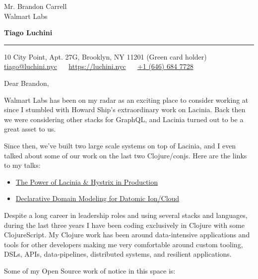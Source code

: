 \documentclass{letter} %
\begin{document}
\signature{Tiago Luchini}                  %
\longindentation=0pt                       %
\let\raggedleft\raggedright                %
 
 
\begin{letter}{Mr. Brandon Carrell \\
Walmart Labs}


\begin{flushleft}
{\large\bf Tiago Luchini}
\end{flushleft}
\medskip\hrule
\begin{flushright}
\hfill 10 City Point, Apt. 27G, Brooklyn, NY 11201 (Green card holder)\\ \hfill
\href{mailto:tiago@luchini.nyc}{tiago@luchini.nyc} ~~
\href{https://luchini.nyc}{https://luchini.nyc} ~~ \href{tel:+16466847728}{+1
  (646) 684 7728}
\end{flushright}
\vfill %
 
\opening{Dear Brandon,}


\noindent Walmart Labs has been on my radar as an exciting place to
consider working at since I stumbled with Howard Ship’s extraordinary
work on Lacinia. Back then we were considering other stacks for
GraphQL, and Lacinia turned out to be a great asset to us.

\noindent Since then, we’ve built two large scale systems on top of
Lacinia, and I even talked about some of our work on the last two
Clojure/conjs. Here are the links to my talks:

\begin{itemize}
  \item \href{https://www.youtube.com/watch?v=uL9QavmAInw}{The Power
    of Lacinia \& Hystrix in Production}
  \item \href{https://www.youtube.com/watch?v=EDojA_fahvM}{Declarative
    Domain Modeling for Datomic Ion/Cloud}
\end{itemize}

\noindent Despite a long career in leadership roles and using several
stacks and languages, during the last three years I have been coding
exclusively in Clojure with some ClojureScript. My Clojure work has
been around data-intensive applications and tools for other developers
making me very comfortable around custom tooling, DSLs, APIs,
data-pipelines, distributed systems, and resilient applications.

\noindent Some of my Open Source work of notice in this space is:


\end{letter}
\end{document}
